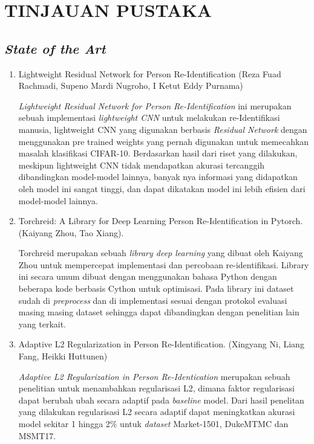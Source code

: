 \chapter{TINJAUAN PUSTAKA}
\vspace{1ex}

\section{\textit{State of the Art}}
\begin{enumerate}
	\item Lightweight Residual Network for Person Re-Identification (Reza Fuad Rachmadi, Supeno Mardi Nugroho, I Ketut Eddy Purnama) \cite{cit:14}
	\par
	\textit{Lightweight Residual Network for Person Re-Identification} ini merupakan sebuah implementasi \textit{lightweight CNN} untuk melakukan re-Identifikasi manusia, lightweight CNN yang digunakan berbasis \textit{Residual Network} dengan menggunakan pre trained weights yang pernah  digunakan untuk memecahkan masalah klasifikasi CIFAR-10. Berdasarkan hasil dari riset yang dilakukan, meskipun lightweight CNN tidak mendapatkan akurasi tercanggih dibandingkan model-model lainnya, banyak nya informasi yang didapatkan oleh model ini sangat tinggi, dan dapat dikatakan model ini lebih efisien dari model-model lainnya.
	\vspace{1ex}
	
	\item Torchreid: A Library for Deep Learning Person Re-Identification in Pytorch. (Kaiyang Zhou, Tao Xiang). \cite{cit:16}
	\par
	Torchreid merupakan sebuah \textit{library deep learning} yang dibuat oleh Kaiyang Zhou untuk mempercepat implementasi dan percobaan re-identifikasi. Library ini secara umum dibuat dengan menggunakan bahasa Python dengan beberapa kode berbasis Cython untuk optimisasi. Pada library ini dataset sudah di \textit{preprocess} dan di implementasi sesuai dengan protokol evaluasi masing masing dataset sehingga dapat dibandingkan dengan penelitian lain yang terkait.
	\vspace{1ex}
	
	\pagebreak
	
	\item Adaptive L2 Regularization in Person Re-Identification. (Xingyang Ni, Liang Fang, Heikki Huttunen) \cite{cit:17}
	\par
	
	\textit{Adaptive L2 Regularization in Person Re-Identication} merupakan sebuah penelitian untuk menambahkan regularisasi L2, dimana faktor regularisasi dapat berubah ubah secara adaptif pada \textit{baseline} model. Dari hasil penelitan yang dilakukan regularisasi L2 secara adaptif dapat meningkatkan akurasi model sekitar 1 hingga 2\% untuk \textit{dataset} Market-1501, DukeMTMC dan MSMT17.
	\vspace{1ex}
	

\end{enumerate}
